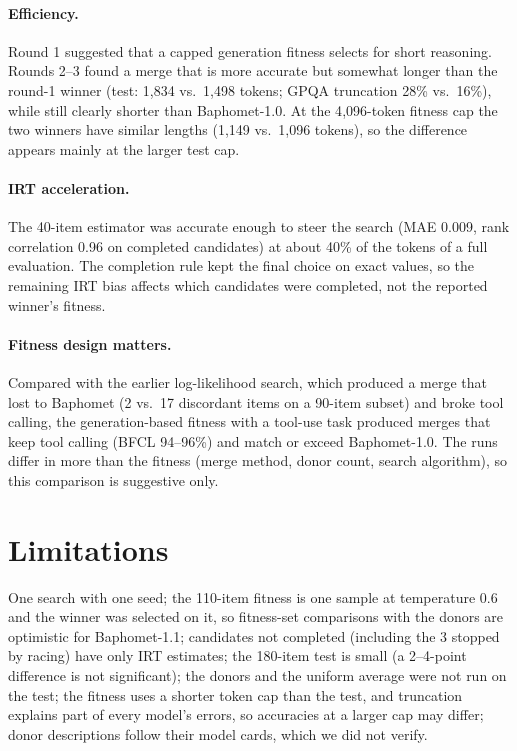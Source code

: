 \documentclass[10pt,a4paper]{article}
\begin{document}
\paragraph{Efficiency.} Round 1 suggested that a capped generation fitness selects for short reasoning. Rounds 2--3 found a merge that is more accurate but somewhat longer than the round-1 winner (test: 1{,}834 vs.\ 1{,}498 tokens; GPQA truncation 28\% vs.\ 16\%), while still clearly shorter than Baphomet-1.0. At the 4{,}096-token fitness cap the two winners have similar lengths (1{,}149 vs.\ 1{,}096 tokens), so the difference appears mainly at the larger test cap.

\paragraph{IRT acceleration.} The 40-item estimator was accurate enough to steer the search (MAE 0.009, rank correlation 0.96 on completed candidates) at about 40\% of the tokens of a full evaluation. The completion rule kept the final choice on exact values, so the remaining IRT bias affects which candidates were completed, not the reported winner's fitness.

\paragraph{Fitness design matters.} Compared with the earlier log-likelihood search, which produced a merge that lost to Baphomet (2 vs.\ 17 discordant items on a 90-item subset) and broke tool calling, the generation-based fitness with a tool-use task produced merges that keep tool calling (BFCL 94--96\%) and match or exceed Baphomet-1.0. The runs differ in more than the fitness (merge method, donor count, search algorithm), so this comparison is suggestive only.

\section{Limitations}
One search with one seed; the 110-item fitness is one sample at temperature 0.6 and the winner was selected on it, so fitness-set comparisons with the donors are optimistic for Baphomet-1.1; candidates not completed (including the 3 stopped by racing) have only IRT estimates; the 180-item test is small (a 2--4-point difference is not significant); the donors and the uniform average were not run on the test; the fitness uses a shorter token cap than the test, and truncation explains part of every model's errors, so accuracies at a larger cap may differ; donor descriptions follow their model cards, which we did not verify.
\end{document}
